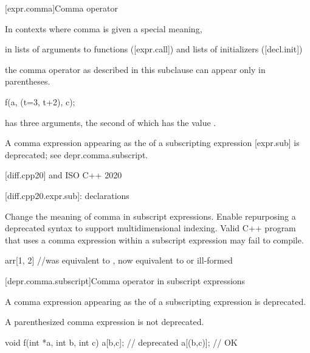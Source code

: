 \documentclass{wg21}
\begin{document}
[expr.comma]{Comma operator}%

\pnum
In contexts where comma is given a special meaning,
\begin{example}
    in
    lists of arguments to functions ([expr.call]) and lists of
    initializers ([decl.init])
\end{example}
the comma operator as
described in this subclause can appear only in parentheses.
\begin{example}
    \begin{codeblock}
        f(a, (t=3, t+2), c);
    \end{codeblock}
    has three arguments, the second of which has the value
    .
\end{example}

\begin{removedblock}
\pnum
\begin{note}
    A comma expression
    appearing as the 
    of a subscripting expression [expr.sub] is deprecated;
    see depr.comma.subscript.
\end{note}
\end{removedblock}


\begin{addedblock}

[diff.cpp20]{\Cpp{} and ISO C++ 2020{}}


[diff.cpp20.expr.sub]{: declarations}


\change Change the meaning of comma in subscript expressions.
\rationale
Enable repurposing a deprecated syntax to support multidimensional indexing.
\effect Valid C++ program that uses a comma expression within a subscript expression
may fail to compile.


\begin{codeblock}
arr[1, 2] //was equivalent to , now equivalent to  or ill-formed
\end{codeblock}

\end{addedblock}


\begin{removedblock}
[depr.comma.subscript]{Comma operator in subscript expressions}

\pnum
A comma expression
appearing as the 
of a subscripting expression is deprecated.
\begin{note}
    A parenthesized comma expression is not deprecated.
\end{note}
\begin{example}
\begin{codeblock}
    void f(int *a, int b, int c) {
        a[b,c];                     // deprecated
        a[(b,c)];                   // OK
    }
\end{codeblock}
\end{example}
\end{removedblock}
\end{document}
